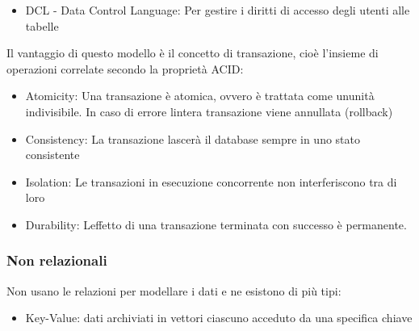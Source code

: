 \documentclass[
]{article}
\providecommand{\tightlist}{%
  \setlength{\itemsep}{0pt}\setlength{\parskip}{0pt}}
\begin{document}
{}

\begin{itemize}
\tightlist
\item
  {DCL }{- Data Control Language: Per gestire i diritti di accesso degli
  utenti alle tabelle}
\end{itemize}

{}

{Il vantaggio di questo modello è il concetto di }{transazione}{, cioè
l'insieme di operazioni correlate secondo la proprietà }{ACID}{:}

\begin{itemize}
\tightlist
\item
  {Atomicity}{: Una transazione è atomica, ovvero è trattata come
  un\textquotesingle unità indivisibile. In caso di errore
  l\textquotesingle intera transazione viene annullata (rollback)}
\end{itemize}

{}

\begin{itemize}
\tightlist
\item
  {Consistency}{: La transazione lascerà il database sempre in uno stato
  consistente}
\end{itemize}

{}

\begin{itemize}
\tightlist
\item
  {Isolation}{: Le transazioni in esecuzione concorrente non
  interferiscono tra di loro}
\end{itemize}

{}

\begin{itemize}
\tightlist
\item
  {Durability}{: L\textquotesingle effetto di una transazione terminata
  con successo è permanente. }
\end{itemize}

{}

\subsubsection{\texorpdfstring{{Non
relazionali}}{Non relazionali}}\label{h.xnccng3k9z76}

{Non usano le relazioni per modellare i dati e ne esistono di più tipi:
}

\begin{itemize}
\tightlist
\item
  {Key-Value: dati archiviati in vettori ciascuno acceduto da una
  specifica chiave}
\end{itemize}
\end{document}
